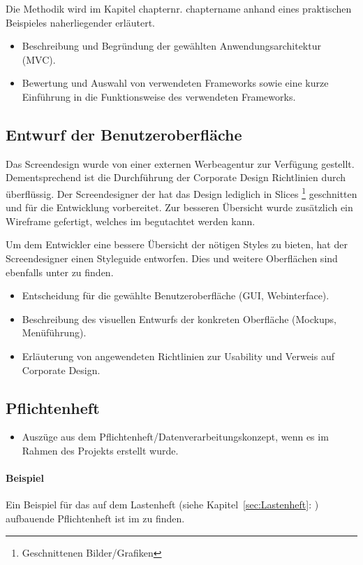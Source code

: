Die Methodik wird im Kapitel \xx chapternr. chaptername anhand eines
praktischen Beispieles naherliegender erläutert.


\begin{itemize}
	\item Beschreibung und Begründung der gewählten Anwendungsarchitektur (\zB \acs{MVC}).
	\item \Ggfs Bewertung und Auswahl von verwendeten Frameworks sowie \ggfs eine kurze Einführung in die Funktionsweise des verwendeten Frameworks.
\end{itemize}


\subsection{Entwurf der Benutzeroberfläche}
\label{sec:Benutzeroberflaeche} 
Das Screendesign wurde von einer externen Werbeagentur zur Verfügung gestellt.
Dementsprechend ist die Durchführung der Corporate Design Richtlinien durch \mh
überflüssig.
Der Screendesigner der \mh hat das Design lediglich in Slices \footnote{Geschnittenen Bilder/Grafiken} 
geschnitten und für die Entwicklung vorbereitet. Zur besseren Übersicht wurde
zusätzlich ein Wireframe gefertigt, welches im 
begutachtet werden kann.


Um dem Entwickler eine bessere Übersicht der nötigen Styles zu bieten, hat der
Screendesigner einen Styleguide entworfen. Dies und weitere Oberflächen sind
ebenfalls unter  zu finden.



\begin{itemize}
	\item Entscheidung für die gewählte Benutzeroberfläche (\zB GUI, Webinterface).
	\item Beschreibung des visuellen Entwurfs der konkreten Oberfläche (\zB Mockups, Menüführung).
	\item \Ggfs Erläuterung von angewendeten Richtlinien zur Usability und Verweis auf Corporate Design.
\end{itemize}


\subsection{Pflichtenheft}
\label{sec:Pflichtenheft}
\begin{itemize}
	\item Auszüge aus dem Pflichtenheft/Datenverarbeitungskonzept, wenn es im Rahmen des Projekts erstellt wurde.
\end{itemize}

\paragraph{Beispiel}
Ein Beispiel für das auf dem Lastenheft (siehe Kapitel~\ref{sec:Lastenheft}: ) aufbauende Pflichtenheft ist im  zu finden.



